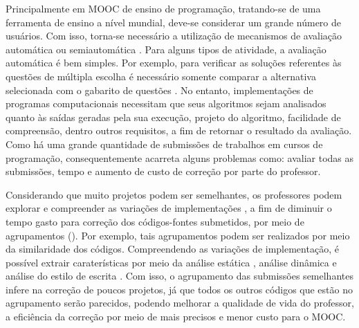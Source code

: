 	Principalmente em MOOC de ensino de programação, tratando-se de uma ferramenta de
	ensino a nível mundial, deve-se considerar um grande número de usuários. Com isso,
	torna-se necessário a utilização de mecanismos de avaliação automática ou
	semiautomática \cite{schmidt2013producing}. Para alguns tipos de atividade, a
	avaliação automática é bem simples. Por exemplo, para verificar as soluções
	referentes às questões de múltipla escolha é necessário somente comparar a
	alternativa selecionada com o gabarito de questões \cite{alario2013analysing}. No
	entanto, implementações de programas computacionais necessitam que seus algoritmos
	sejam analisados quanto às saídas geradas pela sua execução, projeto do algoritmo,
	facilidade de compreensão, dentro outros requisitos, a fim de retornar o resultado
	da avaliação. Como há uma grande quantidade de submissões de trabalhos em cursos
	de programação, consequentemente acarreta alguns problemas como: avaliar todas as
	submissões, tempo e aumento de custo de correção por parte do professor.
	
	
	
	Considerando que muito projetos podem ser semelhantes, os professores podem explorar
	e compreender as variações de implementações \cite{Yin:2015}, a fim de diminuir
	o tempo gasto para correção dos códigos-fontes submetidos, por meio de agrupamentos
	(). Por exemplo, tais agrupamentos podem ser realizados por meio
	da similaridade dos códigos. %
	Compreendendo as variações de implementação, é possível extrair caraterísticas por
	meio da análise estática \cite{Yin:2015,Glassman:2014,Taherkhani:2012}, análise
	dinâmica \cite{Glassman:2015} e análise do estilo de escrita \cite{Wei2015}.
	Com	isso, o agrupamento das submissões semelhantes infere na correção de poucos
	projetos, já que todos os outros códigos que estão no agrupamento serão
	parecidos, podendo melhorar a qualidade de vida do professor, a eficiência da correção  %
	por meio de  mais precisos e menor custo para o MOOC.


